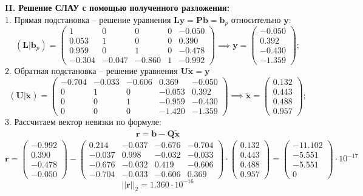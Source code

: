 {\large\bf II. Решение СЛАУ с помощью полученного разложения:}\\
1. Прямая подстановка -- решение уравнения $\mathbf{Ly} = \mathbf{Pb}=\mathbf{b}_p$ относительно $\mathbf{y}$:
\[
(\mathbf{L}|\mathbf{b}_p) =
\left(
\begin{array}{cccc|c}
    1    &  0    &  0    & 0 &-0.050 \\
    0.053&  1    &  0    & 0 & 0.390 \\
    0.959&  0    &  1    & 0 &-0.478 \\
   -0.304& -0.047& -0.860& 1 &-0.992
\end{array}
\right) \implies
\mathbf{y} =
\begin{pmatrix}
    -0.050 \\
     0.392 \\
    -0.430 \\
    -1.359
\end{pmatrix};
\]
2. Обратная подстановка -- решение уравнения $\mathbf{U}\widetilde{\mathbf{x}} = \mathbf{y}$
\[
(\mathbf{U}|\widetilde{\mathbf{x}}) =
\left(
\begin{array}{cccc|c}
    -0.704& -0.033& -0.606& 0.369& -0.050\\
    0    &  1    &  0    & -0.053&  0.392 \\
    0    &  0    &  1    & -0.959& -0.430\\
    0    &  0    &  0    & -1.420& -1.359
\end{array}
\right) \implies
\widetilde{\mathbf{x}} =
\begin{pmatrix}
   0.132\\
   0.443\\
   0.488\\
   0.957
\end{pmatrix};
\]
3. Рассчитаем вектор невязки по формуле:
\begin{align}
    \mathbf{r}=\mathbf{b}-\textbf{Q}\widetilde{\mathbf{x}}
\end{align}
\[
\mathbf{r}=
\begin{pmatrix}
    -0.992 \\
     0.390 \\
    -0.478 \\
    -0.050
\end{pmatrix} -
\begin{pmatrix}
     0.214 & -0.037 & -0.676 & -0.704 \\
    -0.037 &  0.998 & -0.032 & -0.033 \\
    -0.676 & -0.032 &  0.419 & -0.606 \\
    -0.704 & -0.033 & -0.606 &  0.369
\end{pmatrix} \cdot
\begin{pmatrix}
    0.132\\
    0.443\\
    0.488\\
    0.957
\end{pmatrix} =
\begin{pmatrix}
   -11.102\\
    -5.551\\
    -5.551\\
    0
\end{pmatrix} \cdot 10^{-17}
\]
\[
||\mathbf{r}||_2=1.360\cdot10^{-16}
\]

